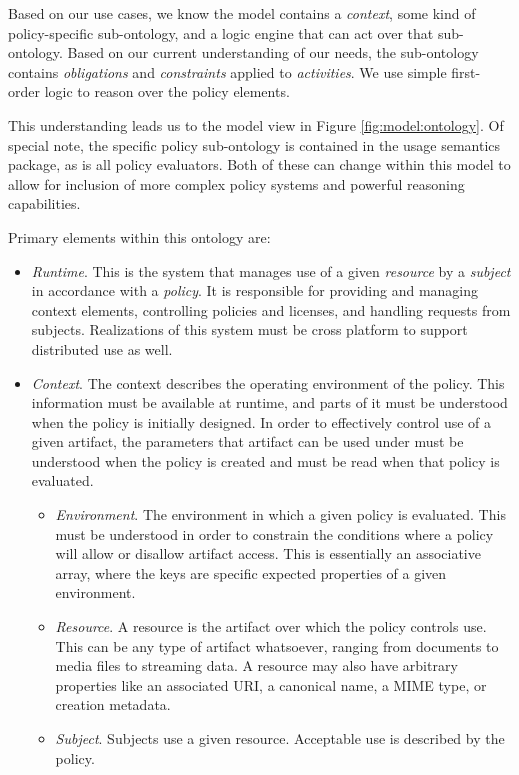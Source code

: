 Based on our use cases, we know the model contains a \textit{context}, some kind of policy-specific sub-ontology, and a logic engine that can act over that sub-ontology.  Based on our current understanding of our needs, the sub-ontology contains \textit{obligations} and \textit{constraints} applied to \textit{activities}.  We use simple first-order logic to reason over the policy elements.

This understanding leads us to the model view in Figure \ref{fig:model:ontology}.  Of special note, the specific policy sub-ontology is contained in the usage semantics package, as is all policy evaluators.  Both of these can change within this model to allow for inclusion of more complex policy systems and powerful reasoning capabilities.

Primary elements within this ontology are:
\begin{itemize}
\item \textit{Runtime}.  This is the system that manages use of a given \textit{resource} by a \textit{subject} in accordance with a \textit{policy}.  It is responsible for providing and managing context elements, controlling policies and licenses, and handling requests from subjects.  Realizations of this system must be cross platform to support distributed use as well.
\item \textit{Context}.  The context describes the operating environment of the policy.  This information must be available at runtime, and parts of it must be understood when the policy is initially designed.  In order to effectively control use of a given artifact, the parameters that artifact can be used under must be understood when the policy is created and must be read when that policy is evaluated.
\begin{itemize}
\item \textit{Environment}.  The environment in which a given policy is evaluated.  This must be understood in order to constrain the conditions where a policy will allow or disallow artifact access.  This is essentially an associative array, where the keys are specific expected properties of a given environment.
\item \textit{Resource}.  A resource is the artifact over which the policy controls use.  This can be any type of artifact whatsoever, ranging from documents to media files to streaming data.  A resource may also have arbitrary properties like an associated URI, a canonical name, a MIME type, or creation metadata.
\item \textit{Subject}.  Subjects use a given resource.  Acceptable use is described by the policy.

\end{itemize}
\end{itemize}
